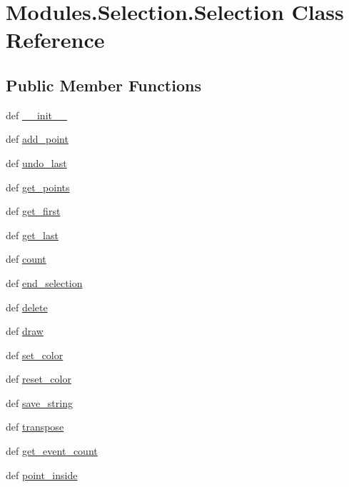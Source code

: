 \hypertarget{classModules_1_1Selection_1_1Selection}{\section{Modules.\-Selection.\-Selection Class Reference}
\label{classModules_1_1Selection_1_1Selection}
}
\subsection*{Public Member Functions}
\begin{DoxyCompactItemize}
\item 
def \hyperlink{classModules_1_1Selection_1_1Selection_a4d921c99a19610c24cccb4bd842af44a}{\-\_\-\-\_\-init\-\_\-\-\_\-}
\item 
def \hyperlink{classModules_1_1Selection_1_1Selection_af2a93edbfe4277ec940d939e97897e57}{add\-\_\-point}
\item 
def \hyperlink{classModules_1_1Selection_1_1Selection_a535a7640e6cc12e9652178160c5ee98d}{undo\-\_\-last}
\item 
def \hyperlink{classModules_1_1Selection_1_1Selection_a9ca3af8c383e55ad57817812a8f615a5}{get\-\_\-points}
\item 
def \hyperlink{classModules_1_1Selection_1_1Selection_a514480f5e8409e4dbd9b2cb3a3833f49}{get\-\_\-first}
\item 
def \hyperlink{classModules_1_1Selection_1_1Selection_a887c36dd384cabbcd212298121cd5902}{get\-\_\-last}
\item 
def \hyperlink{classModules_1_1Selection_1_1Selection_ae345f118be92bdc279539af120c338af}{count}
\item 
def \hyperlink{classModules_1_1Selection_1_1Selection_a4aeff5c923bad8a88892b539672a7843}{end\-\_\-selection}
\item 
def \hyperlink{classModules_1_1Selection_1_1Selection_abe8b7234ad5283109538866ec55cf5d0}{delete}
\item 
def \hyperlink{classModules_1_1Selection_1_1Selection_a106cb30d6f48e711286da425edffa2bf}{draw}
\item 
def \hyperlink{classModules_1_1Selection_1_1Selection_a7e997fbd997e74fb3e0ce9ac03d11d81}{set\-\_\-color}
\item 
def \hyperlink{classModules_1_1Selection_1_1Selection_ab2541bc241efb5e82bab641fea5ce860}{reset\-\_\-color}
\item 
def \hyperlink{classModules_1_1Selection_1_1Selection_a419c19084862d3f29c160c0540a06356}{save\-\_\-string}
\item 
def \hyperlink{classModules_1_1Selection_1_1Selection_ae4f4d863717f7c85453ac9f28bfbb44f}{transpose}
\item 
def \hyperlink{classModules_1_1Selection_1_1Selection_adf363d182b6f41a9a11c0683e27753c3}{get\-\_\-event\-\_\-count}
\item 
def \hyperlink{classModules_1_1Selection_1_1Selection_a777daa5d20d605dbafccd46bec9693ec}{point\-\_\-inside}
\end{DoxyCompactItemize}
